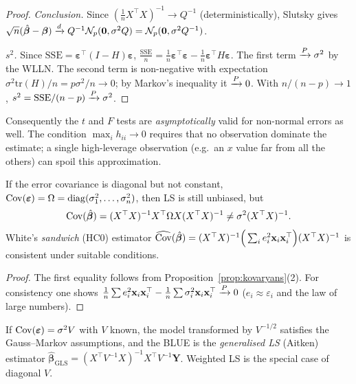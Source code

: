 \documentclass[main.tex]{subfiles}
\begin{document}
\begin{proof}
\emph{Conclusion.} Since $(\tfrac1nX^\top X)^{-1}\to Q^{-1}$ (deterministically), Slutsky gives $\sqrt n(\hat{\bm\beta}-\bm\beta)\xrightarrow{d} Q^{-1}\mathcal{N}_p(\mathbf 0,\sigma^2Q)=\mathcal{N}_p(\mathbf 0,\sigma^2Q^{-1})$.

\emph{$s^2$.} Since $\mathrm{SSE}=\bm\varepsilon^\top(I-H)\bm\varepsilon$, $\frac{\mathrm{SSE}}n=\frac1n\bm\varepsilon^\top\bm\varepsilon-\frac1n\bm\varepsilon^\top H\bm\varepsilon$. The first term $\xrightarrow{P}\sigma^2$ by the WLLN. The second term is non-negative with expectation $\sigma^2\mathrm{tr}(H)/n=p\sigma^2/n\to0$; by Markov's inequality it $\xrightarrow{P}0$. With $n/(n-p)\to1$, $s^2=\mathrm{SSE}/(n-p)\xrightarrow{P}\sigma^2$.
\end{proof}

\begin{remark}
Consequently the $t$ and $F$ tests are \emph{asymptotically} valid for non-normal errors as well. The condition $\max_ih_{ii}\to0$ requires that no observation dominate the estimate; a single high-leverage observation (e.g.\ an $x$ value far from all the others) can spoil this approximation.
\end{remark}

\begin{proposition}\label{prop:sandvic}
If the error covariance is diagonal but not constant, $\operatorname{Cov}(\bm\varepsilon)=\Omega=\operatorname{diag}(\sigma_1^2,\dots,\sigma_n^2)$, then LS is still unbiased, but
\[
\operatorname{Cov}(\hat{\bm\beta})=(X^\top X)^{-1}X^\top\Omega X(X^\top X)^{-1}\neq\sigma^2(X^\top X)^{-1}.
\]
White's \cite{white} \emph{sandwich} (HC0) estimator $\widehat{\operatorname{Cov}}(\hat{\bm\beta})=(X^\top X)^{-1}\Big(\sum_ie_i^2\mathbf x_i\mathbf x_i^\top\Big)(X^\top X)^{-1}$ is consistent under suitable conditions.
\end{proposition}
\begin{proof}
The first equality follows from Proposition~\ref{prop:kovaryans}(2). For consistency one shows $\frac1n\sum e_i^2\mathbf x_i\mathbf x_i^\top-\frac1n\sum\sigma_i^2\mathbf x_i\mathbf x_i^\top\xrightarrow{P}0$ ($e_i\approx\varepsilon_i$ and the law of large numbers).
\end{proof}

\begin{remark}
If $\operatorname{Cov}(\bm\varepsilon)=\sigma^2V$ with $V$ known, the model transformed by $V^{-1/2}$ satisfies the Gauss--Markov assumptions, and the BLUE is the \emph{generalised LS} (Aitken) estimator $\hat{\bm\beta}_{\text{GLS}}=(X^\top V^{-1}X)^{-1}X^\top V^{-1}\mathbf Y$. Weighted LS is the special case of diagonal $V$.
\end{remark}
\end{document}

